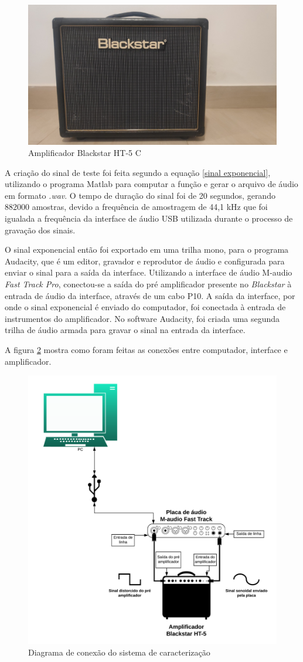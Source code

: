 \begin{figure}
	\centering
	\includegraphics[width=0.5 \linewidth]{figuras/Blackstar1}
	\caption{Amplificador Blackstar HT-5 C}
	\label{fig:Black}
\end{figure}

A criação do sinal de teste foi feita segundo a equação \ref{sinal exponencial}, utilizando o programa Matlab para computar a função e gerar o arquivo de áudio em formato \textit{.wav}. O tempo de duração do sinal foi de 20 segundos, gerando 882000 amostras, devido a frequência de amostragem de 44,1 kHz que foi igualada a frequência da interface de áudio USB utilizada durante o processo de gravação dos sinais.


O sinal exponencial então foi exportado em uma trilha mono, para o programa Audacity, que é um editor, gravador e reprodutor de áudio e configurada para enviar o sinal para a saída da interface. Utilizando a interface de áudio M-audio \textit{Fast Track Pro}, conectou-se a saída do pré amplificador presente no \textit{Blackstar} à entrada de áudio da interface, através de um cabo P10. A saída da interface, por onde o sinal exponencial é enviado do computador, foi conectada à entrada de instrumentos do amplificador. No software Audacity, foi criada uma segunda trilha de áudio armada para gravar o sinal na entrada da interface. 


A figura \ref{fig:diag} mostra como foram feitas as conexões entre computador, interface e amplificador.
\begin{figure}
	\centering
	\includegraphics[width=0.7\linewidth]{figuras/diag}
	\caption{Diagrama de conexão do sistema de caracterização}
	\label{fig:diag}
\end{figure}

